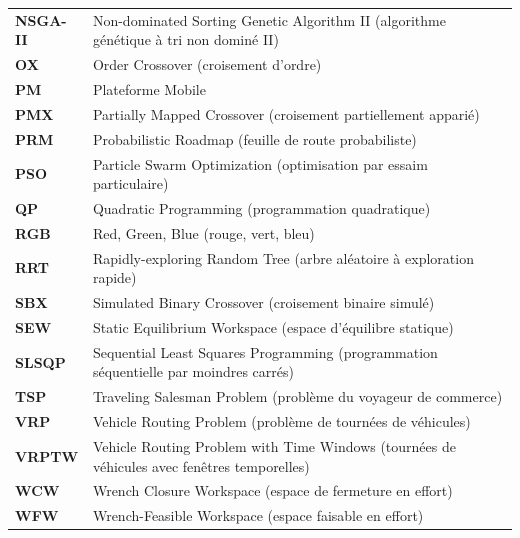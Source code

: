 {\begin{tabular}{@{}>{\bfseries}l@{\ :\ }p{}@{}}
NSGA-II & Non-dominated Sorting Genetic Algorithm II (algorithme génétique à tri non dominé II) \\
OX & Order Crossover (croisement d'ordre) \\
PM & Plateforme Mobile \\
PMX & Partially Mapped Crossover (croisement partiellement apparié) \\
PRM & Probabilistic Roadmap (feuille de route probabiliste) \\
PSO & Particle Swarm Optimization (optimisation par essaim particulaire) \\
QP & Quadratic Programming (programmation quadratique) \\
RGB & Red, Green, Blue (rouge, vert, bleu) \\
RRT & Rapidly-exploring Random Tree (arbre aléatoire à exploration rapide) \\
SBX & Simulated Binary Crossover (croisement binaire simulé) \\
SEW & Static Equilibrium Workspace (espace d'équilibre statique) \\
SLSQP & Sequential Least Squares Programming (programmation séquentielle par moindres carrés) \\
TSP & Traveling Salesman Problem (problème du voyageur de commerce) \\
VRP & Vehicle Routing Problem (problème de tournées de véhicules) \\
VRPTW & Vehicle Routing Problem with Time Windows (tournées de véhicules avec fenêtres temporelles) \\
WCW & Wrench Closure Workspace (espace de fermeture en effort) \\
WFW & Wrench-Feasible Workspace (espace faisable en effort) \\
\end{tabular}
}

